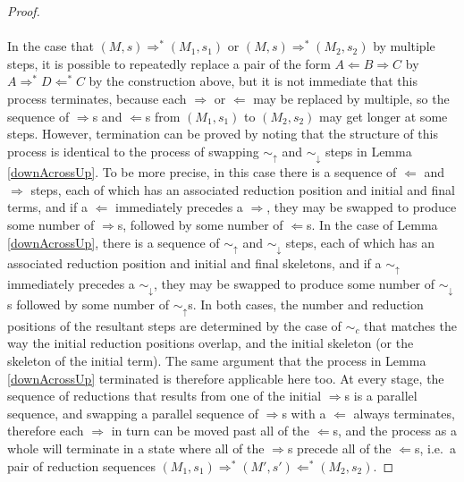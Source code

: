 \documentclass{article}
\theoremstyle{definition}
\theoremstyle{lemma}
\theoremstyle{remark}
\begin{document}
\begin{proof}
\paragraph{}
In the case that $(M,s) \Rightarrow^* (M_1,s_1)$ or $(M,s) \Rightarrow^* (M_2,s_2)$ by multiple steps, it is possible to repeatedly replace a pair of the form $A \Leftarrow B \Rightarrow C$ by $A \Rightarrow^* D \Leftarrow^* C$ by the construction above, but it is not immediate that this process terminates, because each $\Rightarrow$ or $\Leftarrow$ may be replaced by multiple, so the sequence of $\Rightarrow$s and $\Leftarrow$s from $(M_1,s_1)$ to $(M_2,s_2)$ may get longer at some steps. However, termination can be proved by noting that the structure of this process is identical to the process of swapping $\sim_\uparrow$ and $\sim_\downarrow$ steps in Lemma \ref{downAcrossUp}. To be more precise, in this case there is a sequence of $\Leftarrow$ and $\Rightarrow$ steps, each of which has an associated reduction position and initial and final terms, and if a $\Leftarrow$ immediately precedes a $\Rightarrow$, they may be swapped to produce some number of $\Rightarrow$s, followed by some number of $\Leftarrow$s. In the case of Lemma \ref{downAcrossUp}, there is a sequence of $\sim_\uparrow$ and $\sim_\downarrow$ steps, each of which has an associated reduction position and initial and final skeletons, and if a $\sim_\uparrow$ immediately precedes a $\sim_\downarrow$, they may be swapped to produce some number of $\sim_\downarrow$s followed by some number of $\sim_\uparrow$s. In both cases, the number and reduction positions of the resultant steps are determined by the case of $\sim_c$ that matches the way the initial reduction positions overlap, and the initial skeleton (or the skeleton of the initial term). The same argument that the process in Lemma \ref{downAcrossUp} terminated is therefore applicable here too. At every stage, the sequence of reductions that results from one of the initial $\Rightarrow$s is a parallel sequence, and swapping a parallel sequence of $\Rightarrow$s with a $\Leftarrow$ always terminates, therefore each $\Rightarrow$ in turn can be moved past all of the $\Leftarrow$s, and the process as a whole will terminate in a state where all of the $\Rightarrow$s precede all of the $\Leftarrow$s, i.e.~a pair of reduction sequences $(M_1,s_1) \Rightarrow^* (M',s') \Leftarrow^* (M_2,s_2)$.
\end{proof}
\end{document}
